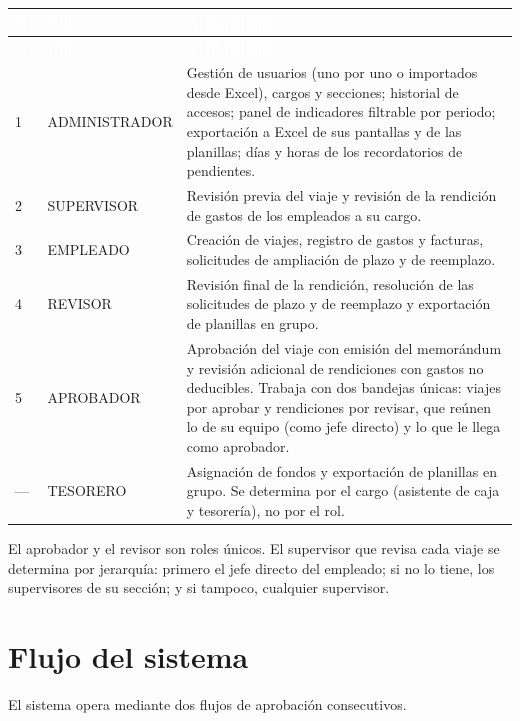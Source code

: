 \documentclass[11pt,letterpaper]{article}
\newcommand{\cabecera}{\rowcolor{maxamPrimario}}
\newcommand{\tth}[1]{\textcolor{white}{\textbf{#1}}}
\begin{document}
\begin{xltabular}{\textwidth}{L{1cm} L{3.4cm} Y}
\cabecera \tth{ID} & \tth{Rol} & \tth{Atribuciones} \\
\endfirsthead
\cabecera \tth{ID} & \tth{Rol} & \tth{Atribuciones} \\
\endhead
{} 1 & ADMINISTRADOR & Gestión de usuarios (uno por uno o importados desde Excel), cargos y secciones; historial de accesos; panel de indicadores filtrable por periodo; exportación a Excel de sus pantallas y de las planillas; días y horas de los recordatorios de pendientes. \\
2 & SUPERVISOR & Revisión previa del viaje y revisión de la rendición de gastos de los empleados a su cargo. \\
 3 & EMPLEADO & Creación de viajes, registro de gastos y facturas, solicitudes de ampliación de plazo y de reemplazo. \\
4 & REVISOR & Revisión final de la rendición, resolución de las solicitudes de plazo y de reemplazo y exportación de planillas en grupo. \\
 5 & APROBADOR & Aprobación del viaje con emisión del memorándum y revisión adicional de rendiciones con gastos no deducibles. Trabaja con dos bandejas únicas: viajes por aprobar y rendiciones por revisar, que reúnen lo de su equipo (como jefe directo) y lo que le llega como aprobador. \\
--- & TESORERO & Asignación de fondos y exportación de planillas en grupo. Se determina por el cargo (asistente de caja y tesorería), no por el rol. \\
\end{xltabular}

El aprobador y el revisor son roles únicos. El supervisor que revisa cada viaje se determina por jerarquía: primero el jefe directo del empleado; si no lo tiene, los supervisores de su sección; y si tampoco, cualquier supervisor.

\section{Flujo del sistema}
El sistema opera mediante dos flujos de aprobación consecutivos.
\end{document}
